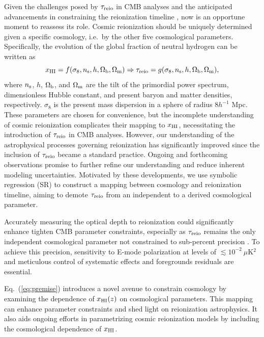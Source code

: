 Given the challenges posed by $\tau_{\mathrm{reio}}$ in CMB analyses and the
anticipated advancements in constraining the reionization timeline
\cite{Montero2021,Hera2022}, now is an opportune moment to reassess its
role.
Cosmic reionization should be uniquely determined given a specific
cosmology, i.e.\ by the other five cosmological parameters.
Specifically, the evolution of the global fraction of neutral hydrogen
can be written as
%
\begin{equation}
\label{eq:premise}
x_{\mathrm{HI}} = f(\sigma_8, n_\mathrm{s}, h, \Omega_\mathrm{b}, \Omega_\mathrm{m}) \Rightarrow \tau_{\mathrm{reio}} = g(\sigma_8, n_\mathrm{s}, h, \Omega_\mathrm{b}, \Omega_\mathrm{m}),
\end{equation}
%
where $n_\mathrm{s}$, $h$, $\Omega_\mathrm{b}$, and $\Omega_\mathrm{m}$ are the tilt of the
primordial power spectrum, dimensionless Hubble constant, and present
baryon and matter densities, respectively.
$\sigma_8$ is the present mass dispersion in a sphere of radius $8
h^{-1}$ Mpc.
These parameters are chosen for convenience, but the incomplete
understanding of cosmic reionization complicates their mapping to
$x_{\mathrm{HI}}$, necessitating the introduction of $\tau_{\mathrm{reio}}$ in CMB analyses.
However, our understanding of the astrophysical processes governing
reionization has significantly improved
\cite{Gnedin2022,Kannan2022,Murray2020,Fan2023} since the inclusion of
$\tau_{\mathrm{reio}}$ became a standard practice.
Ongoing and forthcoming observations promise to further refine our
understanding and reduce inherent modeling uncertainties.
Motivated by these developments, we use symbolic regression (SR)
\cite{Cranmer2023} to construct a mapping between cosmology and
reionization timeline, aiming to demote $\tau_{\mathrm{reio}}$ from an independent
to a derived cosmological parameter.

Accurately measuring the optical depth to reionization could
significantly enhance tighten CMB parameter constraints, especially as
$\tau_{\mathrm{reio}}$ remains the only independent cosmological parameter not
constrained to sub-percent precision \cite{Planck2020b}.
To achieve this precision, sensitivity to E-mode polarization at levels
of $\lesssim 10^{-2} \ \mu$K$^2$ and meticulous control of systematic
effects and foregrounds residuals are essential.

Eq.~(\ref{eq:premise}) introduces a novel avenue to constrain cosmology
by examining the dependence of $x_{\mathrm{HI}}(z)$ on cosmological parameters.
This mapping can enhance parameter constraints and shed light on
reionization astrophysics.
It also aids ongoing efforts in parametrizing cosmic reionization models
\cite{Trac2018,Trac2022} by including the cosmological dependence of
$x_{\mathrm{HI}}$.


